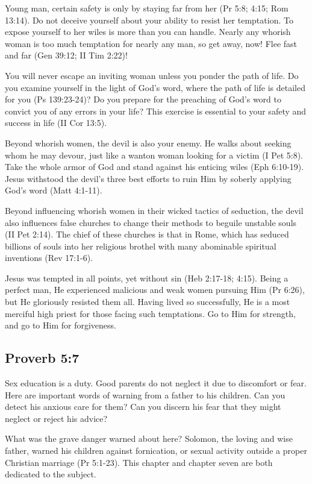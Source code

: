 Young man, certain safety is only by staying far from her (Pr 5:8; 4:15; Rom 13:14). Do not deceive yourself about your ability to resist her temptation. To expose yourself to her wiles is more than you can handle. Nearly any whorish woman is too much temptation for nearly any man, so get away, now! Flee fast and far (Gen 39:12; II Tim 2:22)! 

You will never escape an inviting woman unless you ponder the path of life. Do you examine yourself in the light of God’s word, where the path of life is detailed for you (Ps 139:23-24)? Do you prepare for the preaching of God’s word to convict you of any errors in your life? This exercise is essential to your safety and success in life (II Cor 13:5).

Beyond whorish women, the devil is also your enemy. He walks about seeking whom he may devour, just like a wanton woman looking for a victim (I Pet 5:8). Take the whole armor of God and stand against his enticing wiles (Eph 6:10-19). Jesus withstood the devil’s three best efforts to ruin Him by soberly applying God’s word (Matt 4:1-11).

Beyond influencing whorish women in their wicked tactics of seduction, the devil also influences false churches to change their methods to beguile unstable souls (II Pet 2:14). The chief of these churches is that in Rome, which has seduced billions of souls into her religious brothel with many abominable spiritual inventions (Rev 17:1-6).

Jesus was tempted in all points, yet without sin (Heb 2:17-18; 4:15). Being a perfect man, He experienced malicious and weak women pursuing Him (Pr 6:26), but He gloriously resisted them all. Having lived so successfully, He is a most merciful high priest for those facing such temptations. Go to Him for strength, and go to Him for forgiveness.

\subsection{Proverb 5:7}
Sex education is a duty. Good parents do not neglect it due to discomfort or fear. Here are important words of warning from a father to his children. Can you detect his anxious care for them? Can you discern his fear that they might neglect or reject his advice?

What was the grave danger warned about here? Solomon, the loving and wise father, warned his children against fornication, or sexual activity outside a proper Christian marriage (Pr 5:1-23). This chapter and chapter seven are both dedicated to the subject.

